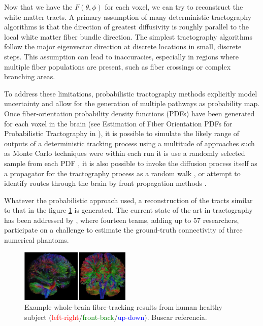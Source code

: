 \documentclass{cys}
\begin{document}
\bigskip
Now that we have the $F(\theta,\phi)$ for each voxel, we can try to reconstruct the white matter tracts. A primary assumption of many deterministic tractography algorithms is that the direction of greatest diffusivity is roughly parallel to the local white matter ﬁber bundle direction. The simplest tractography algorithms follow the major eigenvector direction at discrete locations in small, discrete steps. This assumption can lead to inaccuracies, especially in regions where multiple fiber populations are present, such as fiber crossings or complex branching areas.

\bigskip
To address these limitations, probabilistic tractography methods explicitly model uncertainty and allow for the generation of multiple pathways as probability map. Once ﬁber-orientation probability density functions (PDFs) have been generated for each voxel in the brain (see Estimation of Fiber Orientation PDFs for Probabilistic Tractography in \cite{jones2010diffusion}), it is possible to simulate the likely range of outputs of a deterministic tracking process using a multitude of approaches such as Monte Carlo techniques were within each run it is use a randomly selected sample from each PDF \cite{parker2005probabilistic}, it is also possible to invoke the diffusion process itself as a propagator for the tractography process as a random walk \cite{koch2002investigation}, or attempt to identify routes through the brain by front propagation methods \cite{campbell2005flow}.  

\bigskip
Whatever the probabilistic approach used, a reconstruction of the tracts similar to that in the figure \ref{FullBrainTractography} is generated. The current state of the art in tractography has been addressed by \cite{girard2023tractography}, where fourteen teams, adding up to 57 researchers, participate on a challenge to estimate the ground-truth connectivity of three numerical phantoms.

\begin{figure}[H]
\centering
	\includegraphics[width=0.47\textwidth]{FullBrainTractography}
	\caption{Example whole-brain fibre-tracking results from human healthy subject (\textcolor{red}{left-right}/\textcolor{green}{front-back}/\textcolor{blue}{up-down}). Buscar referencia.}
	\label{FullBrainTractography}
\end{figure}
\end{document}
